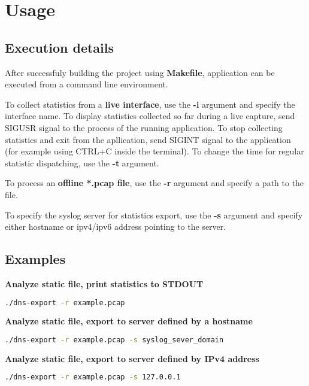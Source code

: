 

\section{Usage}

\subsection{Execution details}

After successfuly building the project using \textbf{Makefile}, application can be executed from a command line environment.

To collect statistics from a \textbf{live interface}, use the \textbf{-i} argument and specify the interface name.
To display statistics collected so far during a live capture, send SIGUSR signal to the process of the running application.
To stop collecting statistics and exit from the apllication, send SIGINT signal to the application (for example using CTRL+C inside the terminal).
To change the time for regular statistic dispatching, use the \textbf{-t} argument.

To process an \textbf{offline *.pcap file}, use the \textbf{-r} argument and specify a path to the file.

To specify the syslog server for statistics export, use the \textbf{-s} argument and specify either hostname or ipv4/ipv6 address pointing to the server.

\subsection{Examples}

\vspace{0.5cm}
\textbf{Analyze static file, print statistics to STDOUT}
\begin{lstlisting}[language=Bash] 
./dns-export -r example.pcap
\end{lstlisting}

\vspace{0.5cm}
\textbf{Analyze static file, export to server defined by a hostname}
\begin{lstlisting}[language=Bash] 
./dns-export -r example.pcap -s syslog_sever_domain
\end{lstlisting}

\vspace{0.5cm}
\textbf{Analyze static file, export to server defined by IPv4 address}
\begin{lstlisting}[language=Bash] 
./dns-export -r example.pcap -s 127.0.0.1
\end{lstlisting}

